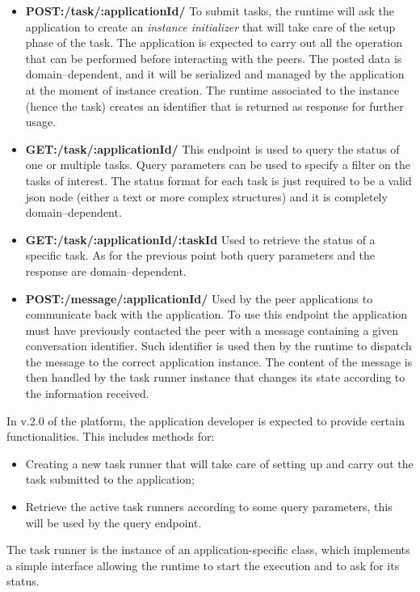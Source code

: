 \begin{itemize}
\item {\bf POST:/task/:applicationId/} To submit tasks, the runtime will ask the application to create an \textit{instance initializer} that will take care of the setup phase of the task. The application is expected to carry out all the operation that can be performed before interacting with the peers. The posted data is domain--dependent, and it will be serialized and managed by the application at the moment of instance creation. The runtime associated to the instance (hence the task) creates an identifier that is returned as response for further usage.

\item {\bf GET:/task/:applicationId/} This endpoint is used to query the status of one or multiple tasks. Query parameters can be used to specify a filter on the tasks of interest. 
The status format for each task is just required to be a valid json node (either a text or more complex structures) and it is completely domain--dependent. %

\item {\bf GET:/task/:applicationId/:taskId} Used to retrieve the status of a specific task. As for the previous point both query parameters and the response are domain--dependent.

\item {\bf POST:/message/:applicationId/} Used by the peer applications to communicate back with the application. To use this endpoint the application must have previously contacted the peer with a message containing a given conversation identifier. Such identifier is used then by the runtime to dispatch the message to the correct application instance. The content of the message is then handled by the task runner instance that changes its state according to the information received.
\end{itemize}

In v.2.0 of the platform, the application developer is expected to provide certain functionalities. This includes methods for:
\begin{itemize}
 	\item Creating a new task runner that will take care of setting up and carry out the task submitted to the application;
 	\item Retrieve the active task runners according to some query parameters, this will be used by the query endpoint.
\end{itemize}
The task runner is the instance of an application-specific class, which implements a simple interface allowing the runtime to start the execution and to ask for its status.


